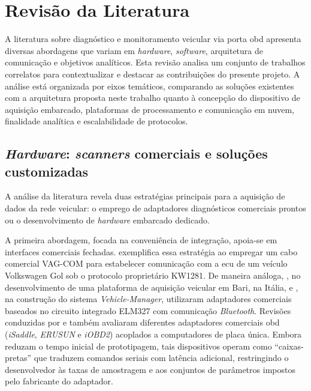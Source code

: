 \documentclass[
	12pt,				%
	openright,			%
	twoside,			%
	a4paper,			%
	english,			%
	brazil				%
	]{abntex2}
\begin{document}
\chapter{Revisão da Literatura}

A literatura sobre diagnóstico e monitoramento veicular via porta \acrshort{obd}
apresenta diversas abordagens que variam em \textit{hardware}, \textit{software},
arquitetura de comunicação e objetivos analíticos. Esta revisão analisa um conjunto de
trabalhos correlatos para contextualizar e destacar as contribuições do presente
projeto. A análise está organizada por eixos temáticos, comparando as soluções
existentes com a arquitetura proposta neste trabalho quanto à concepção do dispositivo
de aquisição embarcado, plataformas de processamento e comunicação em nuvem, finalidade
analítica e escalabilidade de protocolos.

\section{\textit{Hardware}: \textit{scanners} comerciais e soluções customizadas}

A análise da literatura revela duas estratégias principais para a aquisição de dados da
rede veicular: o emprego de adaptadores diagnósticos comerciais prontos ou o
desenvolvimento de \textit{hardware} embarcado dedicado.

A primeira abordagem, focada na conveniência de integração, apoia-se em interfaces
comerciais fechadas.  exemplifica essa estratégia ao empregar um
cabo comercial VAG-COM para estabelecer comunicação com a \acrshort{ecu} de um veículo
Volkswagen Gol sob o protocolo proprietário KW1281. De maneira análoga,
, no desenvolvimento de uma plataforma de aquisição veicular em
Bari, na Itália, e , na construção do sistema
\textit{Vehicle-Manager}, utilizaram adaptadores comerciais baseados no circuito
integrado ELM327 com comunicação \textit{Bluetooth}. Revisões conduzidas por
 e  também avaliaram diferentes
adaptadores comerciais \acrshort{obd} (\textit{iSaddle}, \textit{ERUSUN} e
\textit{iOBD2}) acoplados a computadores de placa única. Embora reduzam o tempo inicial
de prototipagem, tais dispositivos operam como ``caixas-pretas'' que traduzem comandos
seriais com latência adicional, restringindo o desenvolvedor às taxas de amostragem e
aos conjuntos de parâmetros impostos pelo fabricante do adaptador.
\end{document}
